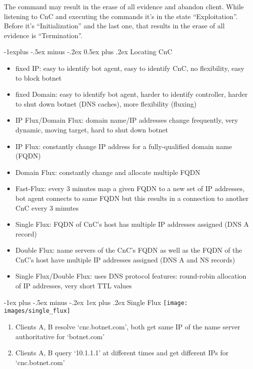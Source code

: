 \documentclass[a4paper,twocolumn]{article}
\makeatletter
\newenvironment{itemization}[1][\small]{%
    \begin{itemize}[leftmargin=*]
            #1
        }{%
    \end{itemize}
}
\newenvironment{myenumerate}[1][\small]{%
    \begin{enumerate}[leftmargin=*]
            #1
        }{%
    \end{enumerate}
}
\renewcommand{\subsection}{%
    \@startsection{subsection}{2}{0mm}%
    {-1explus -.5ex minus -.2ex}%
    {0.5ex plus .2ex}%
    {\normalfont\small\bfseries}
}
\renewcommand{\subsubsection}{%
    \@startsection{subsubsection}{3}{0mm}%
    {-1ex plus -.5ex minus -.2ex}%
    {1ex plus .2ex}%
    {\normalfont\scriptsize\bfseries}
}
\makeatother
\begin{document}
\begin{footnotesize}
The command may result in the erase of all evidence and abandon client.
While listening to CnC and executing the commands it's in the state ``Exploitation''. Before it's ``Initialization'' and the last one, that results in the erase of all evidence is ``Termination''.

\subsection{Locating CnC}
\begin{itemization}
\item fixed IP: easy to identify bot agent, easy to identify CnC, no flexibility, easy to block botnet
\item fixed Domain: easy to identify bot agent, harder to identify controller, harder to shut down botnet (DNS caches), more flexibility (fluxing)
\item IP Flux/Domain Flux: domain name/IP addresses change frequently, very dynamic, moving target, hard to shut down botnet
\item IP Flux: constantly change IP address for a fully-qualified domain name (FQDN)
\item Domain Flux: constantly change and allocate multiple FQDN
\item Fast-Flux: every 3 minutes map a given FQDN to a new set of IP addresses, bot agent connects to same FQDN but this results in a connection to another CnC every 3 minutes
\item Single Flux: FQDN of CnC's host has multiple IP addresses assigned (DNS A record)
\item Double Flux: name servers of the CnC's FQDN as well as the FQDN of the CnC's host have multiple IP addresses assigned (DNS A and NS records)
\item Single Flux/Double Flux: uses DNS protocol features: round-robin allocation of IP addresses, very short TTL values
\end{itemization}

\subsubsection{Single Flux}
\texttt{[image: images/single\_flux]}
\begin{myenumerate}
\item Clients A, B resolve `cnc.botnet.com', both get same IP of the name server authoritative for `botnet.com'
\item Clients A, B query `10.1.1.1' at different times and get different IPs for `cnc.botnet.com'
\end{myenumerate}


\end{footnotesize}
\end{document}
